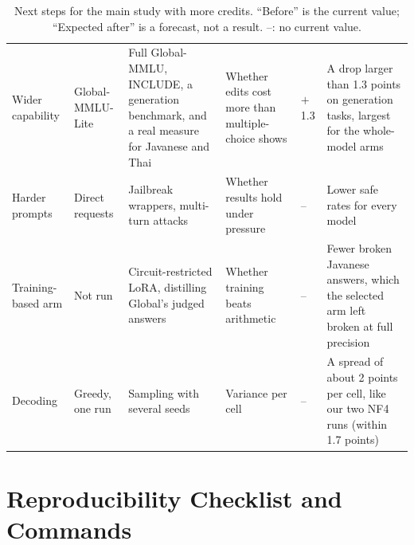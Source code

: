 \documentclass[11pt]{article}
\begin{document}
\begin{table}[t]
\begin{tabular}{L{1.6cm}L{2.8cm}L{2.6cm}L{2.4cm}L{2.3cm}L{3.0cm}}
Wider capability & Global-MMLU-Lite & Full Global-MMLU, INCLUDE, a generation benchmark, and a real measure for
Javanese and Thai & Whether edits cost more than multiple-choice shows & $+$1.3 & A drop larger than 1.3 points on
generation tasks, largest for the whole-model arms \\
Harder prompts & Direct requests & Jailbreak wrappers, multi-turn attacks & Whether results hold under pressure & --
& Lower safe rates for every model \\
Training-based arm & Not run & Circuit-restricted LoRA, distilling Global's judged answers & Whether training beats
arithmetic & -- & Fewer broken Javanese answers, which the selected arm left broken at full precision \\
Decoding & Greedy, one run & Sampling with several seeds & Variance per cell & -- & A spread of about 2 points per
cell, like our two NF4 runs (within 1.7 points) \\
\bottomrule
\end{tabular}
\caption{Next steps for the main study with more credits. ``Before'' is the current value; ``Expected after'' is a
forecast, not a result. --: no current value.}
\label{tab:credits}
\end{table}

\section{Reproducibility Checklist and Commands}\label{app:repro}
\end{document}

